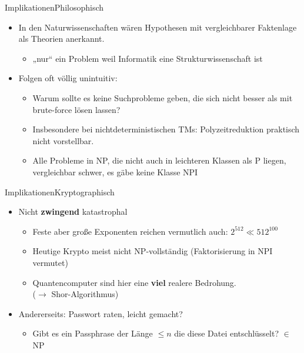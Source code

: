 \documentclass[ignorenonframetext,]{beamer}
\begin{document}
\begin{frame}{Implikationen}{Philosophisch}

\begin{itemize}
\itemsep1pt\parskip0pt
\item
  In den Naturwissenschaften wären Hypothesen mit vergleichbarer
  Faktenlage als Theorien anerkannt.

  \begin{itemize}
  \itemsep1pt\parskip0pt
  \item
    „nur`` ein Problem weil Informatik eine Strukturwissenschaft ist
  \end{itemize}
\item
  Folgen oft völlig unintuitiv:

  \begin{itemize}
  \itemsep1pt\parskip0pt
  \item
    Warum sollte es keine Suchprobleme geben, die sich nicht besser als
    mit brute-force lösen lassen?
  \item
    Insbesondere bei nichtdeterministischen TMs: Polyzeitreduktion
    praktisch nicht vorstellbar.
  \item
    Alle Probleme in NP, die nicht auch in leichteren Klassen als P liegen, vergleichbar
    schwer, es gäbe keine Klasse NPI
  \end{itemize}
\end{itemize}

\end{frame}

\begin{frame}{Implikationen}{Kryptographisch}

\begin{itemize}
\itemsep1pt\parskip0pt
\item
  Nicht \textbf{zwingend} katastrophal

  \begin{itemize}
  \itemsep1pt\parskip0pt
  \item
    Feste aber große Exponenten reichen vermutlich auch:
    $2^{512} \ll 512^{100}$
  \item
    Heutige Krypto meist nicht NP-vollständig (Faktorisierung in NPI
    vermutet)
  \item
    Quantencomputer sind hier eine \textbf{viel} realere Bedrohung.\\
    ($\rightarrow$ Shor-Algorithmus)
  \end{itemize}
\item
  Andererseits: Passwort raten, leicht gemacht?

  \begin{itemize}
  \itemsep1pt\parskip0pt
  \item
    Gibt es ein Passphrase der Länge $\le n$ die diese Datei
    entschlüsselt? $\in$ NP
  \end{itemize}
\end{itemize}

\end{frame}
\end{document}
